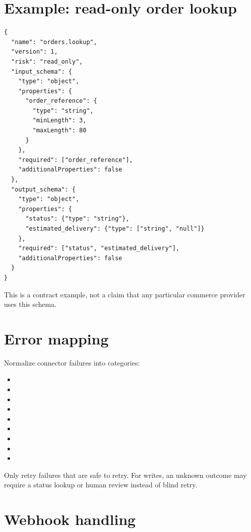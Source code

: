 \section{Example: read-only order lookup}

\begin{lstlisting}
{
  "name": "orders.lookup",
  "version": 1,
  "risk": "read_only",
  "input_schema": {
    "type": "object",
    "properties": {
      "order_reference": {
        "type": "string",
        "minLength": 3,
        "maxLength": 80
      }
    },
    "required": ["order_reference"],
    "additionalProperties": false
  },
  "output_schema": {
    "type": "object",
    "properties": {
      "status": {"type": "string"},
      "estimated_delivery": {"type": ["string", "null"]}
    },
    "required": ["status", "estimated_delivery"],
    "additionalProperties": false
  }
}
\end{lstlisting}

This is a contract example, not a claim that any particular commerce provider uses this schema.

\section{Error mapping}

Normalize connector failures into categories:

\begin{itemize}
\item {}
\item {}
\item {}
\item {}
\item {}
\item {}
\item {}
\item {}
\item {}
\end{itemize}
Only retry failures that are safe to retry. For writes, an unknown outcome may require a status lookup or human review instead of blind retry.

\section{Webhook handling}

